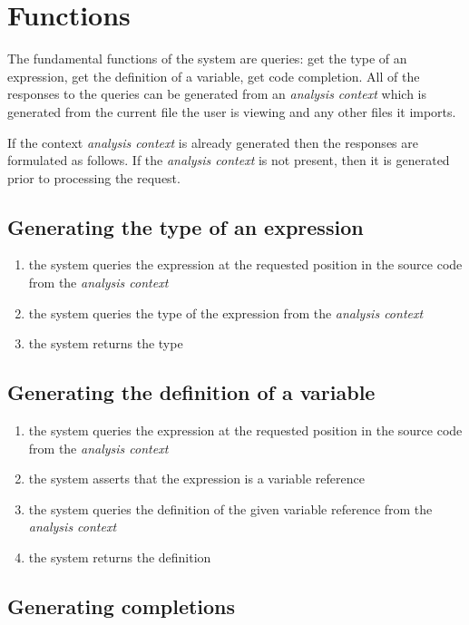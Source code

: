 \documentclass[12pt]{article}
\newcounter{req}
\begin{document}
\section{Functions}

The fundamental functions of the system are queries: get the type of an expression, get the definition of a variable, get code completion. All of the responses to the queries can be generated from an \emph{analysis context} which is generated from the current file the user is viewing and any other files it imports.

If the context \emph{analysis context} is already generated then the responses are formulated as follows. If the \emph{analysis context} is not present, then it is generated prior to processing the request.

\subsection{Generating the type of an expression}

\begin{enumerate}
  \item the system queries the expression at the requested position in the source code from the \emph{analysis context}
  \item the system queries the type of the expression from the \emph{analysis context}
  \item the system returns the type
\end{enumerate}

\subsection{Generating the definition of a variable}

\begin{enumerate}
  \item the system queries the expression at the requested position in the source code from the \emph{analysis context}
  \item the system asserts that the expression is a variable reference
  \item the system queries the definition of the given variable reference from the \emph{analysis context}
  \item the system returns the definition
\end{enumerate}

\subsection{Generating completions}
\end{document}

